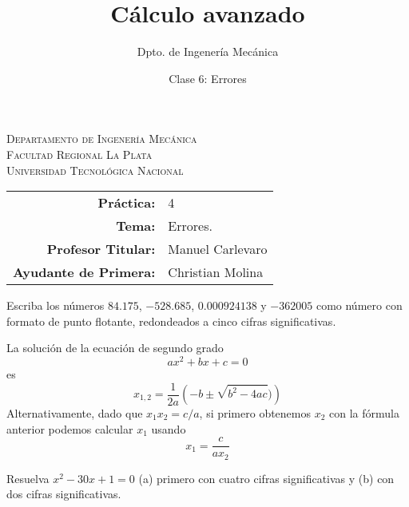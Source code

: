 \documentclass[11pt]{article}
\title{Cálculo avanzado}
\author{Dpto. de Ingenería Mecánica}
\date{Clase 6: Errores}
\begin{document}

\begin{center}
\end{center}

\begin{center}
	\vspace{\baselineskip}
	\Large{\textsc{Departamento de Ingenería Mecánica}} \\
	\textsc{Facultad Regional La Plata} \\
	\textsc{Universidad Tecnológica Nacional}
\end{center}


\begin{center}
	\begin{tabular}{r l}
		\textbf{Práctica:}            & 4                \\
		\textbf{Tema:}                & Errores.         \\
		\textbf{Profesor Titular:}    & Manuel Carlevaro \\
		\textbf{Ayudante de Primera:} & Christian Molina
	\end{tabular}\end{center}

\vspace{1em}

\begin{question} %
	Escriba los números $84.175$, $-528.685$, $0.000924138$ y $-362005$ como número con formato de punto flotante, redondeados a cinco cifras significativas.
\end{question}

\begin{question}  %
	La solución de la ecuación de segundo grado
	\[ a x^2 + b x + c = 0 \]
	es
	\[ x_{1,2} = \frac{1}{2a} \left( -b \pm \sqrt{b^2 - 4 a c}) \right) \]
	Alternativamente, dado que $x_1 x_2 = c/a$, si primero obtenemos $x_2$ con la fórmula anterior podemos calcular $x_1$ usando
	\[ x_1 = \frac{c}{a x_2} \]

	Resuelva $x^2 - 30 x + 1 = 0$ (a) primero con cuatro cifras significativas y (b) con dos cifras significativas.
\end{question}
\end{document}
